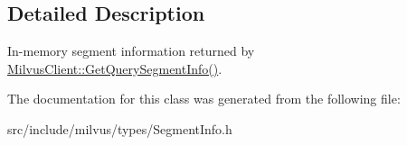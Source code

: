 \subsection{Detailed Description}
In-\/memory segment information returned by \hyperlink{classmilvus_1_1_milvus_client_a7a5a78cb57e5d80adea1f1b0bffe5ba0}{Milvus\+Client\+::\+Get\+Query\+Segment\+Info()}. 

The documentation for this class was generated from the following file\+:\begin{DoxyCompactItemize}
\item 
src/include/milvus/types/Segment\+Info.\+h\end{DoxyCompactItemize}
